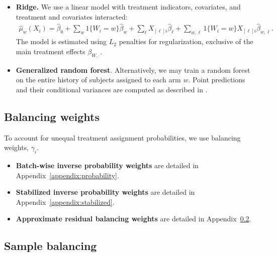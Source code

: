 \documentclass[letterpaper, 12pt, parskip=full, headsepline]{scrartcl}
\begin{document}
\begin{itemize}
\item \textbf{Ridge.} We use a linear model with treatment indicators, covariates, and treatment and covariates interacted:
\begin{align}
\hat{\mu}_w(X_{i}) = \hat{\beta}_{0} +
			\sum_{w} 1\{W_i = w\}\hat\beta_w  +
			\sum_{\ell}  X_{[\ell]i}\hat{\beta}_{\ell} +
         \sum_{w,\ell} 1\{ W_{i} = w\} X_{[\ell]i} \hat{\beta}_{w, \ell}.
         \label{eq:linear_model_full}
\end{align} 
The model is estimated using $L_{2}$ %
penalties for regularization, exclusive of the main treatment effects $\beta_{W,\cdot}$.

\item \textbf{Generalized random forest}.  Alternatively, we may train a random forest  %
on the entire history of subjects assigned to each arm $w$. Point predictions and their conditional variances are computed as described in \citet[section 4]{athey2016generalized}. 
\end{itemize}



\subsection{Balancing weights} To account for unequal treatment assignment probabilities, we use balancing weights, $\gamma_i$. 
\begin{itemize}\setlength\itemsep{0em}
\item \textbf{Batch-wise inverse probability weights} are detailed in Appendix~\ref{appendix:probability}. 
\item \textbf{Stabilized inverse probability weights} are detailed in Appendix~\ref{appendix:stabilized}.
\item \textbf{Approximate residual balancing weights} are detailed in Appendix~\ref{appendix:sample_balancing}.
\end{itemize}






\subsection{Sample balancing}
\label{appendix:sample_balancing}
\end{document}
